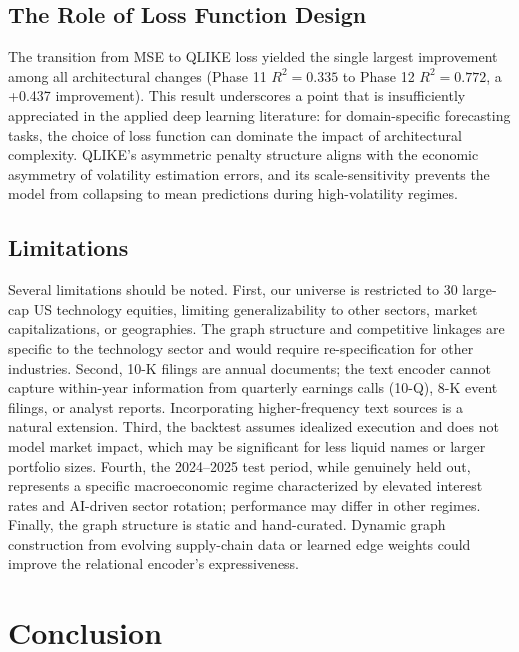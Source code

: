 \documentclass[12pt, a4paper]{article}
\begin{document}
\subsection{The Role of Loss Function Design}

The transition from MSE to QLIKE loss yielded the single largest improvement among all architectural changes (Phase 11 $R^2 = 0.335$ to Phase 12 $R^2 = 0.772$, a +0.437 improvement). This result underscores a point that is insufficiently appreciated in the applied deep learning literature: for domain-specific forecasting tasks, the choice of loss function can dominate the impact of architectural complexity. QLIKE's asymmetric penalty structure aligns with the economic asymmetry of volatility estimation errors, and its scale-sensitivity prevents the model from collapsing to mean predictions during high-volatility regimes.

\subsection{Limitations}

Several limitations should be noted. First, our universe is restricted to 30 large-cap US technology equities, limiting generalizability to other sectors, market capitalizations, or geographies. The graph structure and competitive linkages are specific to the technology sector and would require re-specification for other industries. Second, 10-K filings are annual documents; the text encoder cannot capture within-year information from quarterly earnings calls (10-Q), 8-K event filings, or analyst reports. Incorporating higher-frequency text sources is a natural extension. Third, the backtest assumes idealized execution and does not model market impact, which may be significant for less liquid names or larger portfolio sizes. Fourth, the 2024--2025 test period, while genuinely held out, represents a specific macroeconomic regime characterized by elevated interest rates and AI-driven sector rotation; performance may differ in other regimes. Finally, the graph structure is static and hand-curated. Dynamic graph construction from evolving supply-chain data or learned edge weights could improve the relational encoder's expressiveness.


\section{Conclusion}
\label{sec:conclusion}
\end{document}
